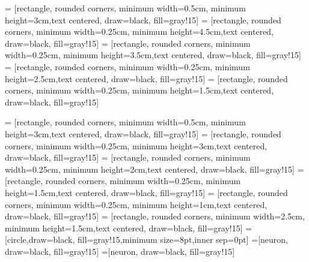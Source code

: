 

 = [rectangle, rounded corners, minimum width=0.5cm, minimum height=3cm,text centered, draw=black, fill=gray!15]
 = [rectangle, rounded corners, minimum width=0.25cm, minimum height=4.5cm,text centered, draw=black, fill=gray!15]
 = [rectangle, rounded corners, minimum width=0.25cm, minimum height=3.5cm,text centered, draw=black, fill=gray!15]
 = [rectangle, rounded corners, minimum width=0.25cm, minimum height=2.5cm,text centered, draw=black, fill=gray!15]
 = [rectangle, rounded corners, minimum width=0.25cm, minimum height=1.5cm,text centered, draw=black, fill=gray!15]



 = [rectangle, rounded corners, minimum width=0.5cm, minimum height=3cm,text centered, draw=black, fill=gray!15]
 = [rectangle, rounded corners, minimum width=0.25cm, minimum height=3cm,text centered, draw=black, fill=gray!15]
 = [rectangle, rounded corners, minimum width=0.25cm, minimum height=2cm,text centered, draw=black, fill=gray!15]
 = [rectangle, rounded corners, minimum width=0.25cm, minimum height=1.5cm,text centered, draw=black, fill=gray!15]
 = [rectangle, rounded corners, minimum width=0.25cm, minimum height=1cm,text centered, draw=black, fill=gray!15]
 = [rectangle, rounded corners, minimum width=2.5cm, minimum height=1.5cm,text centered, draw=black, fill=gray!15]
=[circle,draw=black, fill=gray!15,minimum size=8pt,inner sep=0pt]
=[neuron, draw=black, fill=gray!15]
=[neuron, draw=black, fill=gray!15]

